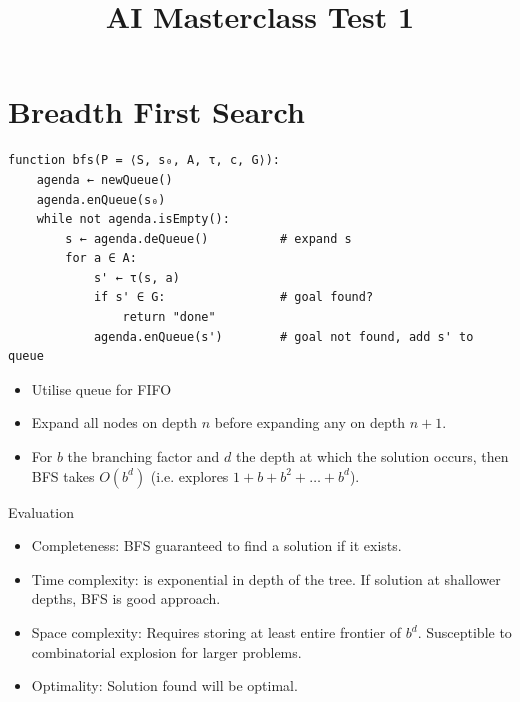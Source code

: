\documentclass[12pt, a4paper]{article}
\title{AI Masterclass Test 1}
\author{}
\date{}
\begin{document}
\section{Breadth First Search}
\begin{algorithm}[H]
\end{algorithm}
\begin{Verbatim}
function bfs(P = ⟨S, s₀, A, τ, c, G⟩):
    agenda ← newQueue()
    agenda.enQueue(s₀)
    while not agenda.isEmpty():
        s ← agenda.deQueue()          # expand s
        for a ∈ A:
            s' ← τ(s, a)
            if s' ∈ G:                # goal found?
                return "done"
            agenda.enQueue(s')        # goal not found, add s' to queue
\end{Verbatim}

\begin{itemize}
    \item Utilise queue for FIFO
    \item Expand all nodes on depth $n$ before expanding any on depth $n+1$.
    \item For $b$ the branching factor and $d$ the depth at which the solution occurs,
    then BFS takes $O(b^d)$ (i.e. explores $1 + b + b^2 +\ldots + b^d$).
\end{itemize}

\noindent Evaluation
\begin{itemize}
    \item Completeness: BFS guaranteed to find a solution if it exists.
    \item Time complexity: is exponential in depth of the tree. If solution at shallower depths, BFS is good approach.
    \item Space complexity: Requires storing at least entire frontier of $b^d$. Susceptible to combinatorial explosion for larger problems.
    \item Optimality: Solution found will be optimal.
\end{itemize}
\end{document}
